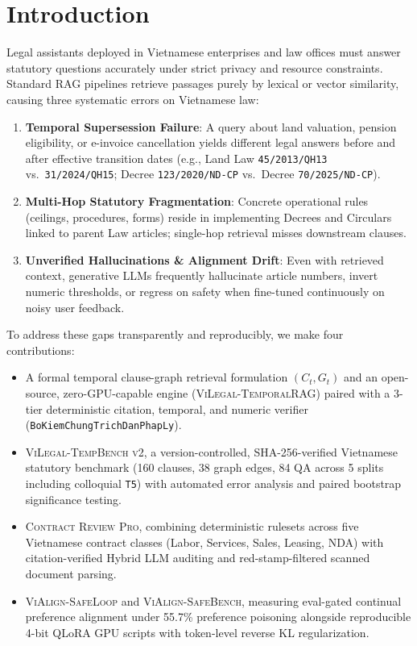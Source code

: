 \documentclass[11pt,a4paper]{article}
\begin{document}
\section{Introduction}
Legal assistants deployed in Vietnamese enterprises and law offices must answer statutory questions accurately under strict privacy and resource constraints. Standard RAG pipelines retrieve passages purely by lexical or vector similarity, causing three systematic errors on Vietnamese law:
\begin{enumerate}
  \item \textbf{Temporal Supersession Failure}: A query about land valuation, pension eligibility, or e-invoice cancellation yields different legal answers before and after effective transition dates (e.g., Land Law \texttt{45/2013/QH13} vs.\ \texttt{31/2024/QH15}; Decree \texttt{123/2020/ND-CP} vs.\ Decree \texttt{70/2025/ND-CP}).
  \item \textbf{Multi-Hop Statutory Fragmentation}: Concrete operational rules (ceilings, procedures, forms) reside in implementing Decrees and Circulars linked to parent Law articles; single-hop retrieval misses downstream clauses.
  \item \textbf{Unverified Hallucinations \& Alignment Drift}: Even with retrieved context, generative LLMs frequently hallucinate article numbers, invert numeric thresholds, or regress on safety when fine-tuned continuously on noisy user feedback.
\end{enumerate}

To address these gaps transparently and reproducibly, we make four contributions:
\begin{itemize}
  \item A formal temporal clause-graph retrieval formulation $(C_t, G_t)$ and an open-source, zero-GPU-capable engine (\textsc{ViLegal-TemporalRAG}) paired with a 3-tier deterministic citation, temporal, and numeric verifier (\texttt{BoKiemChungTrichDanPhapLy}).
  \item \textsc{ViLegal-TempBench v2}, a version-controlled, SHA-256-verified Vietnamese statutory benchmark (160 clauses, 38 graph edges, 84 QA across 5 splits including colloquial \texttt{T5}) with automated error analysis and paired bootstrap significance testing.
  \item \textsc{Contract Review Pro}, combining deterministic rulesets across five Vietnamese contract classes (Labor, Services, Sales, Leasing, NDA) with citation-verified Hybrid LLM auditing and red-stamp-filtered scanned document parsing.
  \item \textsc{ViAlign-SafeLoop} and \textsc{ViAlign-SafeBench}, measuring eval-gated continual preference alignment under 55.7\% preference poisoning alongside reproducible 4-bit QLoRA GPU scripts with token-level reverse KL regularization.
\end{itemize}
\end{document}
